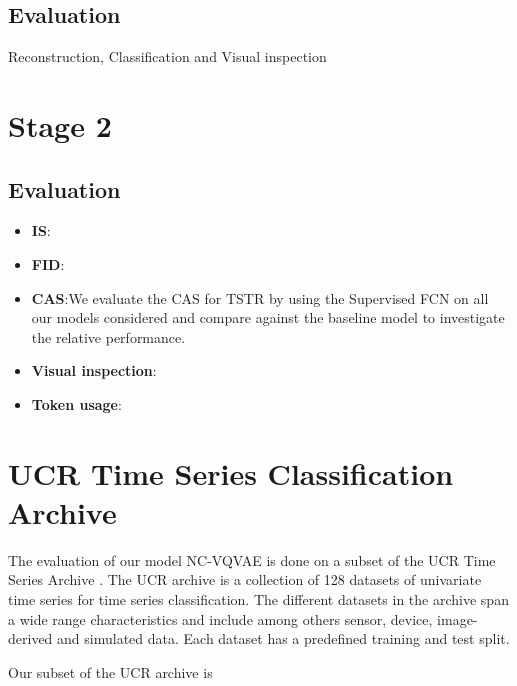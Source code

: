 \documentclass[../../thesis.tex]{subfiles}
\begin{document}
\subsection{Evaluation}
Reconstruction, Classification and Visual inspection



\section{Stage 2}

\subsection{Evaluation}

\begin{itemize}
    \item \textbf{IS}:
    \item \textbf{FID}:
    \item \textbf{CAS}:We evaluate the CAS for TSTR by using the Supervised FCN on all our models considered and compare against the baseline model to investigate the relative performance. 
    \item \textbf{Visual inspection}:
    \item \textbf{Token usage}:
\end{itemize}


\section{UCR Time Series Classification Archive}
The evaluation of our model NC-VQVAE is done on a subset of the UCR Time Series Archive \cite{UCRArchive2018}. The UCR archive is a collection of 128 datasets of univariate time series for time series classification. The different datasets in the archive span a wide range characteristics and include among others sensor, device, image-derived and simulated data. Each dataset has a predefined training and test split.\newline

Our subset of the UCR archive is
\end{document}
